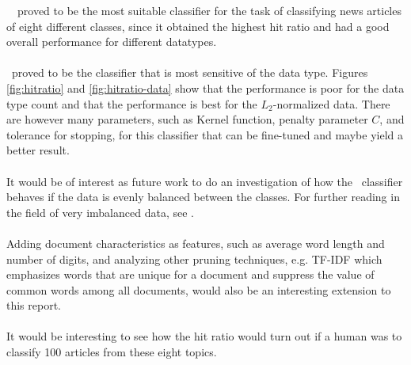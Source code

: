 \mn\ \nb\ proved to be the most suitable classifier for the task of classifying news articles of eight different classes, since it obtained the highest hit ratio and had a good overall performance for different datatypes.
\\\\
\svm\ proved to be the classifier that is most sensitive of the data type. Figures \ref{fig:hitratio} and \ref{fig:hitratio-data} show that the performance is poor for the data type count and that the performance is best for the $L_2$-normalized data. There are however many parameters, such as Kernel function, penalty parameter $C$, and tolerance for stopping, for this classifier that can be fine-tuned and maybe yield a better result.
\\\\
It would be of interest as future work to do an investigation of how the \rf\ classifier behaves if the data is evenly balanced between the classes. For further reading in the field of very imbalanced data, see \cite{Chen}.
\\\\
Adding document characteristics as features, such as average word length and number of digits, and analyzing other pruning techniques, e.g. TF-IDF which emphasizes words that are unique for a document and suppress the value of common words among all documents, would also be an interesting extension to this report.
\\\\
It would be interesting to see how the hit ratio would turn out if a human was to classify 100 articles from these eight topics. 